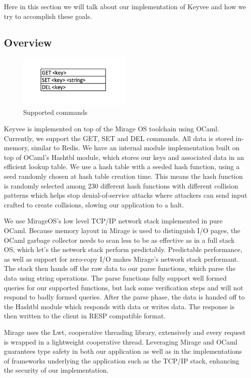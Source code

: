 \documentclass[english,10pt,twocolumn]{article}
\begin{document}
Here in this section we will talk about our implementation of Keyvee and how we try to accomplish these goals.

\subsection{Overview}

\begin{figure}[ht]
  \centering
  \caption{Supported commands}
  \includegraphics[width=0.5\textwidth]{images/commands}
\end{figure}

Keyvee is implemented on top of the Mirage OS toolchain using OCaml. Currently, we support the GET, SET and DEL commands. All data is stored in-memory, similar to Redis. We have an internal module implementation built on top of OCaml's Hashtbl module, which stores our keys and associated data in an efficient lookup table. We use a hash table with a seeded hash function, using a seed randomly chosen at hash table creation time. This means the hash function is randomly selected among 230 different hash functions with different collision patterns which helps stop denial-of-service attacks where attackers can send input crafted to create collisions, slowing our application to a halt.

We use MirageOS's low level TCP/IP network stack implemented in pure OCaml. Because memory layout in Mirage is used to distinguish I/O pages, the OCaml garbage collector needs to scan less to be as effective as in a full stack OS, which let's the network stack perform predictably. Predictable performance, as well as support for zero-copy I/O makes Mirage's network stack performant. The stack then hands off the raw data to our parse functions, which parse the data using string operations. The parse functions fully support well formed queries for our supported functions, but lack some verification steps and will not respond to badly formed queries. After the parse phase, the data is handed off to the Hashtbl module which responds with data or writes data. The response is then written to the client in RESP compatible format.

Mirage uses the Lwt, cooperative threading library, extensively and every request is wrapped in a lightweight cooperative thread. Leveraging Mirage and OCaml guarantees type safety in both our application as well as in the implementations of frameworks underlying the application such as the TCP/IP stack, enhancing the security of our implementation.
\end{document}
